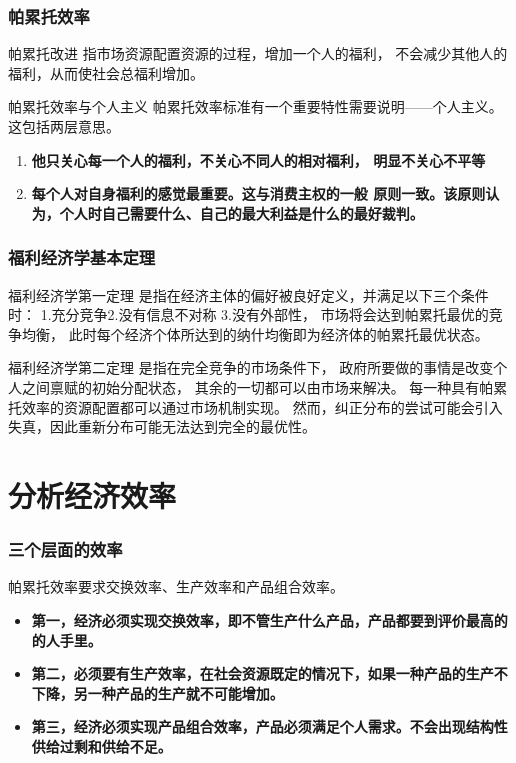 \documentclass[aspectratio=169, 12pt]{beamer}
\begin{document}
\begin{frame}[plain]
    \frametitle{帕累托效率}
    \begin{block}{帕累托改进}
        指市场资源配置资源的过程，增加一个人的福利，
不会减少其他人的福利，从而使社会总福利增加。
    \end{block}
    \begin{block}{帕累托效率与个人主义}
       帕累托效率标准有一个重要特性需要说明——个人主义。这包括两层意思。
       \begin{enumerate}
        \item \textbf{他只关心每一个人的福利，不关心不同人的相对福利，
        明显不关心不平等}
        \item \textbf{每个人对自身福利的感觉最重要。这与消费主权的一般
        原则一致。该原则认为，个人时自己需要什么、自己的最大利益是什么的最好裁判。}
       \end{enumerate}
    \end{block}
\end{frame}

\begin{frame}[plain]
    \frametitle{福利经济学基本定理}
    \begin{block}{福利经济学第一定理}
        是指在经济主体的偏好被良好定义，并满足以下三个条件时：
        1.充分竞争2.没有信息不对称 3.没有外部性，
        市场将会达到帕累托最优的竞争均衡，
        此时每个经济个体所达到的纳什均衡即为经济体的帕累托最优状态。
    \end{block}
    \begin{block}{福利经济学第二定理}
        是指在完全竞争的市场条件下，
        政府所要做的事情是改变个人之间禀赋的初始分配状态，
        其余的一切都可以由市场来解决。
        每一种具有帕累托效率的资源配置都可以通过市场机制实现。
        然而，纠正分布的尝试可能会引入失真，因此重新分布可能无法达到完全的最优性。
    \end{block}
\end{frame}

\section{分析经济效率}

\begin{frame}[plain]
    \frametitle{三个层面的效率}
    帕累托效率要求交换效率、生产效率和产品组合效率。
    \begin{itemize}
        \item \textbf{第一，经济必须实现交换效率，即不管生产什么产品，产品都要到评价最高的的人手里。}
        \item \textbf{第二，必须要有生产效率，在社会资源既定的情况下，如果一种产品的生产不下降，另一种产品的生产就不可能增加。}
        \item \textbf{第三，经济必须实现产品组合效率，产品必须满足个人需求。不会出现结构性供给过剩和供给不足。}
    \end{itemize}
\end{frame}
\end{document}
